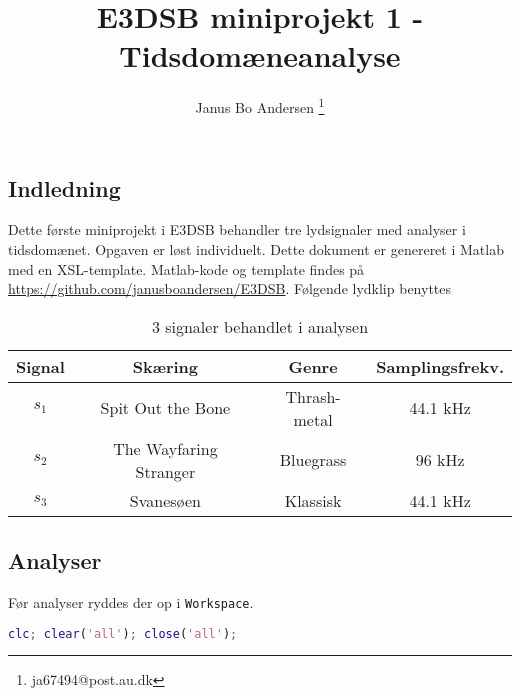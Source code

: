 \documentclass[a4paper]{report}
\author{Janus Bo Andersen \thanks{ja67494@post.au.dk}}
\begin{document}


    
    
    \title{E3DSB miniprojekt 1 - Tidsdomæneanalyse}
        

    \maketitle

\tableofcontents
\newpage


    \begin{par}

\chapter{Indledning}
Dette første miniprojekt i E3DSB behandler tre lydsignaler med analyser i tidsdomænet.
Opgaven er løst individuelt.
Dette dokument er genereret i Matlab med en XSL-template.
Matlab-kode og template findes på \url{https://github.com/janusboandersen/E3DSB}.
Følgende lydklip benyttes \\
\begin{table}[H]
\centering
\begin{tabular}{| c | c | c | c |} \hline
Signal & Skæring & Genre & Samplingsfrekv. \\ \hline
$s_1$ & Spit Out the Bone & Thrash-metal & 44.1 \si{\kilo\hertz} \\ \hline
$s_2$ & The Wayfaring Stranger & Bluegrass & 96 \si{\kilo\hertz} \\ \hline
$s_3$ & Svanesøen & Klassisk & 44.1 \si{\kilo\hertz} \\ \hline
\end{tabular}\caption{3 signaler behandlet i analysen}\label{tab:lydklip}\end{table}

\end{par} 
\begin{par}

\chapter{Analyser}
Før analyser ryddes der op i \texttt{Workspace}.\\

\end{par} 

\begin{lstlisting}[language=Matlab, style=Matlab-editor]
clc; clear('all'); close('all');
\end{lstlisting}
\end{document}
